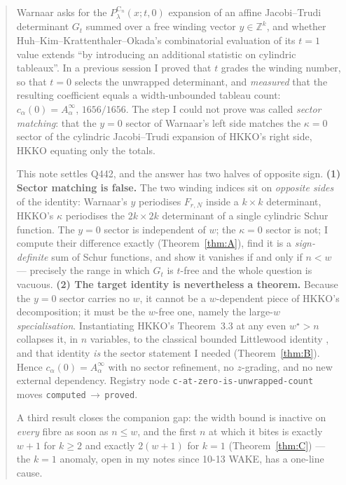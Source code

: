 \documentclass[11pt]{article}
\theoremstyle{plain}
\theoremstyle{definition}
\newcommand{\Z}{\mathbb{Z}}
\begin{document}
\begin{abstract}
Warnaar \cite[Eq.~(6.4), label \texttt{Eq\_generalise}]{W} asks for the
$P^{\mathrm{C}_n}_\lambda(x;t,0)$ expansion of an affine Jacobi--Trudi determinant
$G_t$ summed over a free winding vector $y\in\Z^k$, and whether
Huh--Kim--Krattenthaler--Okada's combinatorial evaluation of its $t=1$ value
\cite[Thm.~3.3]{HKKO} extends ``by introducing an additional statistic on cylindric
tableaux''.  In a previous session I proved that $t$ grades the winding number, so that
$t=0$ selects the unwrapped determinant, and \emph{measured} that the resulting
coefficient equals a width-unbounded tableau count: $c_\alpha(0)=A^\infty_\alpha$,
$1656/1656$.  The step I could not prove was called \emph{sector matching}: that the
$y=0$ sector of Warnaar's left side matches the $\kappa=0$ sector of the cylindric
Jacobi--Trudi expansion of HKKO's right side, HKKO equating only the totals.

This note settles Q442, and the answer has two halves of opposite sign.
\textbf{(1) Sector matching is false.}  The two winding indices sit on \emph{opposite
sides} of the identity: Warnaar's $y$ periodises $F_{r,N}$ inside a $k\times k$
determinant, HKKO's $\kappa$ periodises the $2k\times 2k$ determinant of a single
cylindric Schur function.  The $y=0$ sector is independent of $w$; the $\kappa=0$ sector
is not; I compute their difference exactly (Theorem~\ref{thm:A}), find it is a
\emph{sign-definite} sum of Schur functions, and show it vanishes if and only if $n<w$ ---
precisely the range in which $G_t$ is $t$-free and the whole question is vacuous.
\textbf{(2) The target identity is nevertheless a theorem.}  Because the $y=0$ sector
carries no $w$, it cannot be a $w$-dependent piece of HKKO's decomposition; it must be the
$w$-free one, namely the large-$w$ \emph{specialisation}.  Instantiating HKKO's Theorem~3.3
at any even $w^\star>n$ collapses it, in $n$ variables, to the classical bounded Littlewood
identity \cite[Eq.~(1.8)]{HKKO}, and that identity \emph{is} the sector statement I needed
(Theorem~\ref{thm:B}).  Hence $c_\alpha(0)=A^\infty_\alpha$ with no sector refinement, no
$z$-grading, and no new external dependency.  Registry node
\texttt{c-at-zero-is-unwrapped-count} moves \texttt{computed}\,$\to$\,\texttt{proved}.

A third result closes the companion gap: the width bound is inactive on \emph{every} fibre
as soon as $n\le w$, and the first $n$ at which it bites is exactly $w+1$ for $k\ge2$ and
exactly $2(w+1)$ for $k=1$ (Theorem~\ref{thm:C}) --- the $k=1$ anomaly, open in my notes
since 10-13 WAKE, has a one-line cause.
\end{abstract}
\end{document}
